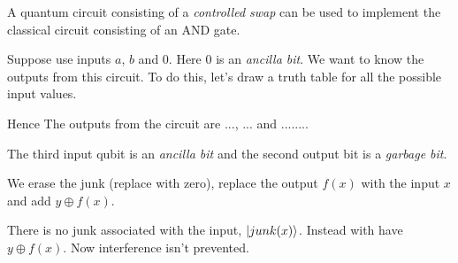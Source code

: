 \begin{example}
A quantum circuit consisting of a \textit{controlled swap} can be used to 
implement the classical circuit consisting of an AND gate.

Suppose use inputs $a$, $b$ and 0. Here 0 is an \textit{ancilla bit}.
We want to know the outputs from this circuit. To do this, 
let's draw a truth table for all the possible input values.




Hence The outputs from the circuit are ..., ... and ........


The third input qubit is an 
\textit{ancilla bit} and the second output bit 
is a \textit{garbage bit}.




We erase the junk (replace with zero), 
replace the output $f(x)$ with the input $x$ 
and add $y \oplus f(x)$.

There is no junk associated with the input, $\left|junk(x)\right\rangle$.
Instead with have $y \oplus f(x)$. Now interference isn't prevented.


\end{example}